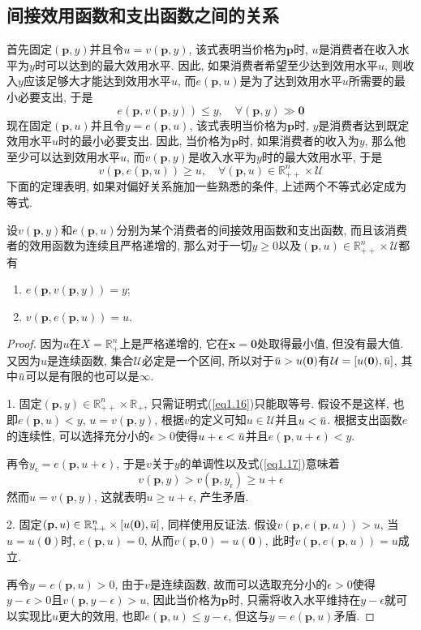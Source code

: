\documentclass[cn, 12pt, math=mtpro2, bibstyle=apa, blue, twocol]{elegantbook}
\newcommand{\R}{\mathbb{R}}
\newcommand{\p}{\mathbf{p}}
\newcommand{\x}{\mathbf{x}}
\newcommand{\overbar}[1]{\mkern 1.5mu\overline{\mkern-1.5mu#1\mkern-1.5mu}\mkern 1.5mu}
\begin{document}
\subsection{间接效用函数和支出函数之间的关系}
首先固定$(\p,y)$并且令$u=v(\p,y)$, 该式表明当价格为$\p$时, $u$是消费者在收入水平为$y$时可以达到的最大效用水平. 因此, 如果消费者希望至少达到效用水平$u$, 则收入$y$应该足够大才能达到效用水平$u$, 而$e(\p,u)$是为了达到效用水平$u$所需要的最小必要支出, 于是
\begin{equation}\label{eq1.16}
  e(\p,v(\p,y))\leq y,\quad\forall (\p,y)\gg\mathbf{0}
\end{equation}
现在固定$(\p,u)$并且令$y=e(\p,u)$, 该式表明当价格为$\p$时, $y$是消费者达到既定效用水平$u$时的最小必要支出. 因此, 当价格为$\p$时, 如果消费者的收入为$y$, 那么他至少可以达到效用水平$u$, 而$v(\p,y)$是收入水平为$y$时的最大效用水平, 于是
\begin{equation}\label{eq1.17}
  v(\p,e(\p,u))\geq u,\quad\forall(\p,u)\in\R_{++}^n\times\mathcal{U}
\end{equation}
下面的定理表明, 如果对偏好关系施加一些熟悉的条件, 上述两个不等式必定成为等式.

\begin{theorem}\label{thm:thm1.3}
  设$v(\p,y)$和$e(\p,u)$分别为某个消费者的间接效用函数和支出函数, 而且该消费者的效用函数为连续且严格递增的, 那么对于一切$y\ge0$以及$(\p,u)\in\R_{++}^n\times\mathcal{U}$都有
  \begin{enumerate}[label=\arabic*.]
    \item $e(\p,v(\p,y))=y$;
    \item $v(\p,e(\p,u))=u$.
  \end{enumerate}
\end{theorem}
\begin{proof}
  因为$u$在$X=\R_+^n$上是严格递增的, 它在$\x=\mathbf{0}$处取得最小值, 但没有最大值. 又因为$u$是连续函数, 集合$\mathcal{U}$必定是一个区间, 所以对于$\overbar{u}>u(\mathbf{0})$有$\mathcal{U}=[u(\mathbf{0}),\overbar{u}]$, 其中$\overbar{u}$可以是有限的也可以是$\infty$.

  1. 固定$(\p,y)\in\R_{++}^n\times\R_+$, 只需证明式(\ref{eq1.16})只能取等号. 假设不是这样, 也即$e(\p,u)<y$, $u=v(\p,y)$, 根据$v$的定义可知$u\in\mathcal{U}$并且$u<\overbar{u}$. 根据支出函数$e$的连续性, 可以选择充分小的$\epsilon>0$使得$u+\epsilon<\overbar{u}$并且$e(\p,u+\epsilon)<y$.

  再令$y_\epsilon=e(\p,u+\epsilon)$, 于是$v$关于$y$的单调性以及式(\ref{eq1.17})意味着
  $$v(\p,y)>v(\p,y_\epsilon)\geq u+\epsilon$$
  然而$u=v(\p,y)$, 这就表明$u\ge u+\epsilon$, 产生矛盾.

  2. 固定$(\p,u)\in\R_{++}^n\times [u(\mathbf{0}),\overbar{u}]$, 同样使用反证法. 假设$v(\p,e(\p,u))>u$, 当$u=u(\mathbf{0})$时, $e(\p,u)=0$, 从而$v(\p,0)=u(\mathbf{0})$, 此时$v(\p,e(\p,u))=u$成立.

  再令$y=e(\p,u)>0$, 由于$v$是连续函数, 故而可以选取充分小的$\epsilon>0$使得$y-\epsilon>0$且$v(\p,y-\epsilon)>u$, 因此当价格为$\p$时, 只需将收入水平维持在$y-\epsilon$就可以实现比$u$更大的效用, 也即$e(\p,u)\leq y-\epsilon$, 但这与$y=e(\p,u)$矛盾.
\end{proof}
\end{document}
